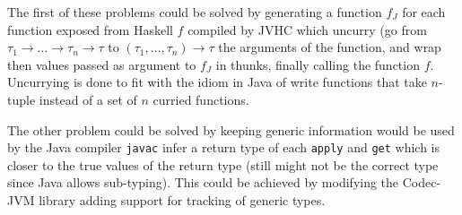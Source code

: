 \documentclass[float=false, crop=false]{standalone}
\begin{document}
The first of these problems could be solved by generating a function $f_J$ for each 
function exposed from Haskell $f$ compiled by JVHC which uncurry 
(go from \mbox{$\tau_1 \rightarrow \dotsc \rightarrow \tau_n \rightarrow \tau$} to
\mbox{$(\tau_1,\dotsc,\tau_n) \rightarrow \tau$} the arguments of the function, and 
wrap then values passed as argument to $f_J$ in thunks, finally calling the function $f$. 
Uncurrying is done to fit with the idiom in Java of write functions that take 
$n$-tuple instead of a set of $n$ curried functions. 

The other problem could be solved by keeping generic information would be used by 
the Java compiler \texttt{javac} infer a return type of each \texttt{apply} and \texttt{get}
which is closer to the true values of the return type (still might not be the correct type 
since Java allows sub-typing). This could be achieved by modifying the Codec-JVM library 
\cite{codec-jvm-link} adding support for tracking of generic types.
\end{document}

